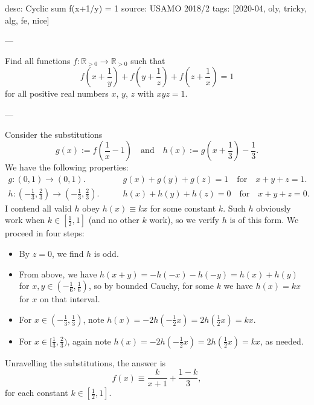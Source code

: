 desc: Cyclic sum f(x+1/y) = 1
source: USAMO 2018/2
tags: [2020-04, oly, tricky, alg, fe, nice]

---

Find all functions $f:\mathbb R_{>0}\to\mathbb R_{>0}$ such that \[f\left(x+\frac1y\right)+f\left(y+\frac1z\right)+f\left(z+\frac1x\right)=1\]
for all positive real numbers $x$, $y$, $z$ with $xyz=1$.

---

Consider the substitutions \[g(x):=f\left(\frac1x-1\right)\quad\text{and}\quad h(x):=g\left(x+\frac13\right)-\frac13.\]
We have the following properties:
\begin{align*}
    g:(0,1)\to(0,1).&\qquad g(x)+g(y)+g(z)=1\quad\text{for}\quad x+y+z=1.\\
    h:(-\tfrac13,\tfrac23)\to(-\tfrac13,\tfrac23).&\qquad h(x)+h(y)+h(z)=0\quad\text{for}\quad x+y+z=0.
\end{align*}
I contend all valid $h$ obey $h(x)\equiv kx$ for some constant $k$. Such $h$ obviously work when $k\in[\tfrac12,1]$ (and no other $k$ work), so we verify $h$ is of this form. We proceed in four steps:
\begin{itemize}
    \item By $z=0$, we find $h$ is odd.
    \item From above, we have $h(x+y)=-h(-x)-h(-y)=h(x)+h(y)$ for $x,y\in(-\tfrac16,\tfrac16)$, so by bounded Cauchy, for some $k$ we have $h(x)=kx$ for $x$ on that interval.
    \item For $x\in(-\tfrac13,\tfrac13)$, note $h(x)=-2h(-\tfrac12x)=2h(\tfrac12x)=kx$.
    \item For $x\in[\tfrac13,\tfrac23)$, again note $h(x)=-2h(-\tfrac12x)=2h(\tfrac12x)=kx$, as needed.
\end{itemize}

Unravelling the substitutions, the answer is \[f(x)\equiv\frac k{x+1}+\frac{1-k}3,\]
for each constant $k\in[\tfrac12,1]$.
